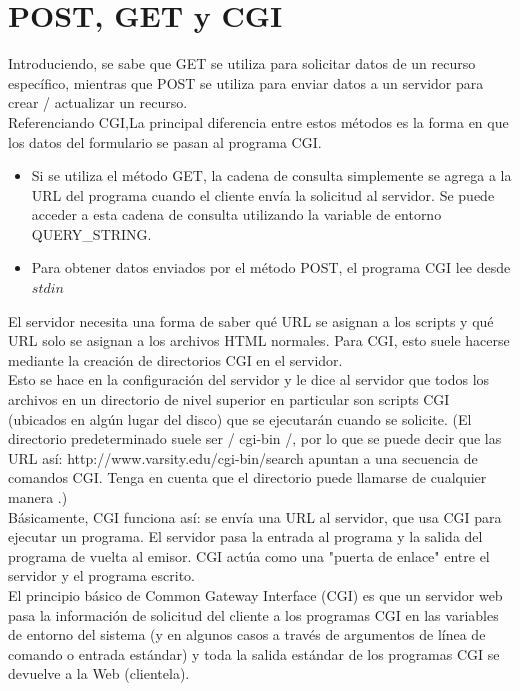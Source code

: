 \documentclass{article}
\begin{document}
\section{POST, GET y CGI}

Introduciendo, se sabe que GET se utiliza para solicitar datos de un recurso específico, mientras que POST se utiliza para enviar datos a un servidor para crear / actualizar un recurso.\\

Referenciando CGI,La principal diferencia entre estos métodos es la forma en que los datos del formulario se pasan al programa CGI. \\

\begin{itemize}
\item Si se utiliza el método GET, la cadena de consulta simplemente se agrega a la URL del programa cuando el cliente envía la solicitud al servidor. Se puede acceder a esta cadena de consulta utilizando la variable de entorno QUERY\_STRING. 
\item Para obtener datos enviados por el método POST, el programa CGI lee desde $stdin$
\end{itemize}

El servidor necesita una forma de saber qué URL se asignan a los scripts y qué URL solo se asignan a los archivos HTML normales. Para CGI, esto suele hacerse mediante la creación de directorios CGI en el servidor.\\

Esto se hace en la configuración del servidor y le dice al servidor que todos los archivos en un directorio de nivel superior en particular son scripts CGI (ubicados en algún lugar del disco) que se ejecutarán cuando se solicite. (El directorio predeterminado suele ser / cgi-bin /, por lo que se puede decir que las URL así: http://www.varsity.edu/cgi-bin/search apuntan a una secuencia de comandos CGI. Tenga en cuenta que el directorio puede llamarse de cualquier manera .)\\

Básicamente, CGI funciona así: se envía una URL al servidor, que usa CGI para ejecutar un programa. El servidor pasa la entrada al programa y la salida del programa de vuelta al emisor.  CGI actúa como una "puerta de enlace" entre el servidor y el programa escrito.\\

El principio básico de Common Gateway Interface (CGI) es que un servidor web pasa la información de solicitud del cliente a los programas CGI en las variables de entorno del sistema (y en algunos casos a través de argumentos de línea de comando o entrada estándar) y toda la salida estándar de los programas CGI se devuelve a la Web (clientela).\\
\end{document}
